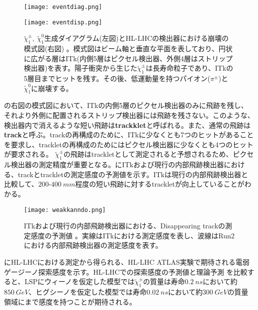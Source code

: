 \begin{figure}[tbp]
  \begin{minipage}[b]{0.38\linewidth}
    \centering
    \texttt{[image: eventdiag.png]}
  \end{minipage}
  \begin{minipage}[b]{0.62\linewidth}
    \centering
    \texttt{[image: eventdisp.png]}
  \end{minipage}
  \caption[$\tilde{\chi}_1^{\pm},\ \tilde{\chi}_1^0$生成ダイアグラムと崩壊の模式図]{$\tilde{\chi}_1^{\pm},\ \tilde{\chi}_1^0$生成ダイアグラム(左図)とHL-LHCの検出器における崩壊の模式図(右図) \cite{winos}。模式図はビーム軸と垂直な平面を表しており、円状に広がる層はITk(内側5層はピクセル検出器、外側4層はストリップ検出器)を表す。陽子衝突から生じた$\tilde{\chi}_1^{\pm}$は長寿命粒子であり、ITkの5層目までヒットを残す。その後、低運動量を持つパイオン($\pi^{\pm}$)と$\tilde{\chi}_1^0$に崩壊する。}
  \label{fig:eventchargeno}
\end{figure}


の右図の模式図において、ITkの内側5層のピクセル検出器のみに飛跡を残し、それより外側に配置されるストリップ検出器には飛跡を残さない。このような、検出器内で消えるような短い飛跡は\textbf{trackklet}と呼ばれる。また、通常の飛跡は\textbf{track}と呼ぶ。trackの再構成のために、ITkに少なくとも7つのヒットがあることを要求し、trackletの再構成のためにはピクセル検出器に少なくとも4つのヒットが要求される。
$\tilde{\chi}_1^{\pm}$の飛跡はtrackletとして測定されると予想されるため、ピクセル検出器の測定精度が重要となる。にITkおよび現行の内部飛跡検出器における、trackとtrackletの測定感度の予測値を示す。ITkは現行の内部飛跡検出器と比較して、$200$-$400\ \si{mm}$程度の短い飛跡に対するtrackletが向上していることがわかる。

\begin{figure}[tbp]
  \centering
  \texttt{[image: weakkanndo.png]}
  \caption[ITkおよび現行の内部飛跡検出器における、Disappearing trackの測定感度の予測値]{ITkおよび現行の内部飛跡検出器における、Disappearing trackの測定感度の予測値 \cite{itk}。実線はITkにおける測定感度を表し、波線はRun2における内部飛跡検出器の測定感度を表す。}
  \label{fig:weakkanndo}
\end{figure}

にHL-LHCにおける測定から得られる、HL-LHC ATLAS実験で期待される電弱ゲージーノ探索感度を示す。HL-LHCでの探索感度の予測値と理論予測 \cite{winoriron}を比較すると、LSPにウィーノを仮定した模型では$\tilde{\chi}_1^{\pm}$の質量は寿命$0.2\ \si{ns}$において約$850\ \si{GeV}$、ヒグシーノを仮定した模型では寿命$0.02\ \si{ns}$において約$300\ \si{GeV}$の質量領域にまで感度を持つことが期待される。

